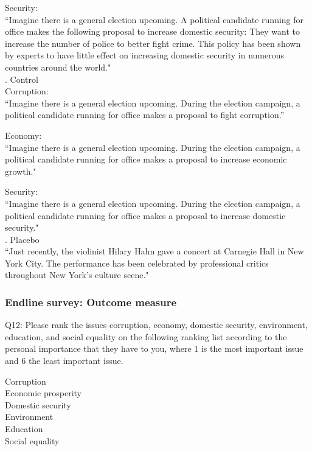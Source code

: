 \documentclass[11pt]{article}
\begin{document}
Security:\\
“Imagine there is a general election upcoming. A political candidate running for office makes the following proposal to increase domestic security: They want to increase the number of police to better fight crime. This policy has been shown by experts to have little effect on increasing domestic security in numerous countries around the world."\\

. Control\\

Corruption:\\
“Imagine there is a general election upcoming. During the election campaign, a political candidate running for office makes a proposal to fight corruption.”

Economy:\\
“Imagine there is a general election upcoming. During the election campaign, a political candidate running for office makes a proposal to increase economic growth."

Security:\\
“Imagine there is a general election upcoming. During the election campaign, a political candidate running for office makes a proposal to increase domestic security."\\

. Placebo\\

\noindent “Just recently, the violinist Hilary Hahn gave a concert at Carnegie Hall in New York City. The performance has been celebrated by professional critics throughout New York's culture scene."


\subsubsection{Endline survey: Outcome measure}

Q12: Please rank the issues corruption, economy, domestic security, environment, education, and social equality on the following ranking list according to the personal importance that they have to you, where 1 is the most important issue and 6 the least important issue.

\noindent Corruption\\
Economic prosperity\\
Domestic security\\
Environment\\
Education\\
Social equality\\
\end{document}
